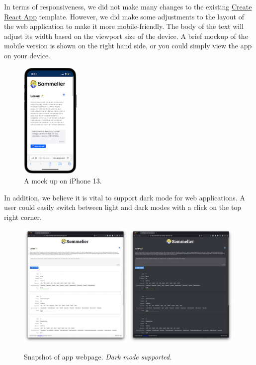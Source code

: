 \documentclass[
	a4paper,
	fontsize=10pt, %
	twoside=false, %
	secnumdepth=2, %
]{kaohandt}
\begin{document}
In terms of responsiveness, we did not make many changes to the existing \href{https://create-react-app.dev/}{Create React App} template. However, we did make some adjustments to the layout of the web application to make it more mobile-friendly. The body of the text will adjust its width based on the viewport size of the device. A brief mockup of the mobile version is shown on the right hand side, or you could simply view the app on your device.

\begin{figure}[h]
	\centering
	\includegraphics[width=0.25\textwidth]{mobile-mockup}
	\caption{A mock up on iPhone 13.}
	\label{fig:mobile}
\end{figure}

In addition, we believe it is vital to support dark mode for web applications. A user could easily switch between light and dark modes with a click on the top right corner.

\begin{figure}[h]
	\includegraphics[width=0.49\textwidth]{sommelier-view-01.jpg}
	\includegraphics[width=0.49\textwidth]{sommelier-view-02.jpg}
	\caption{Snapshot of app webpage. \emph{Dark mode supported.}}
	\label{fig:app_overview}
\end{figure}
\end{document}
